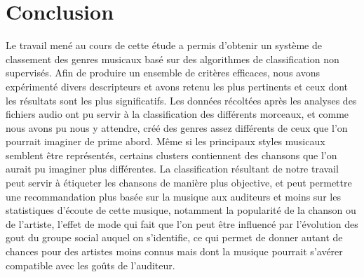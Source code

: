 \documentclass{ir}
\begin{document}
\section{Conclusion}
Le travail mené au cours de cette étude a permis d’obtenir un système de classement des genres musicaux basé sur 
des algorithmes de classification non supervisés. Afin de produire un ensemble de critères efficaces, nous avons 
expérimenté divers descripteurs et avons retenu les plus pertinents et ceux dont les résultats sont les plus 
significatifs.  Les données récoltées après les analyses des fichiers audio ont pu servir à la classification des 
différents morceaux, et comme nous avons pu nous y attendre, créé des genres assez différents de ceux que l’on 
pourrait imaginer de prime abord. Même si les principaux styles musicaux semblent être représentés, certains 
clusters contiennent des chansons que l’on aurait pu imaginer plus différentes. La classification résultant de 
notre travail peut servir à étiqueter les chansons de manière plus objective, et peut permettre une 
recommandation plus basée sur la musique aux auditeurs et moins sur les statistiques d’écoute de cette musique, 
notamment la popularité de la chanson ou de l’artiste, l’effet de mode qui fait que l’on peut être influencé par 
l’évolution des gout du groupe social auquel on s’identifie, ce qui permet de donner autant de chances pour des 
artistes moins connus mais dont la musique pourrait s’avérer compatible avec les goûts de l’auditeur.




\appendix
\end{document}
